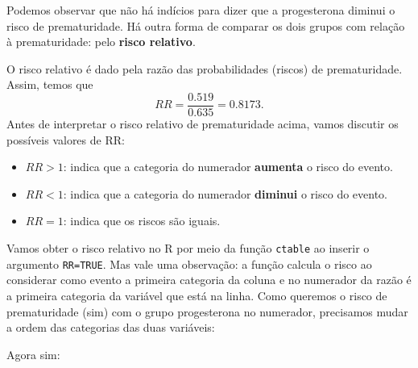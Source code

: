 \documentclass[
]{book}
\newenvironment{Shaded}{\begin{snugshade}}{\end{snugshade}}
\newcommand{\CommentTok}[1]{\textcolor[rgb]{0.56,0.35,0.01}{\textit{#1}}}
\newcommand{\DataTypeTok}[1]{\textcolor[rgb]{0.13,0.29,0.53}{#1}}
\newcommand{\KeywordTok}[1]{\textcolor[rgb]{0.13,0.29,0.53}{\textbf{#1}}}
\newcommand{\NormalTok}[1]{#1}
\newcommand{\OperatorTok}[1]{\textcolor[rgb]{0.81,0.36,0.00}{\textbf{#1}}}
\newcommand{\OtherTok}[1]{\textcolor[rgb]{0.56,0.35,0.01}{#1}}
\newcommand{\StringTok}[1]{\textcolor[rgb]{0.31,0.60,0.02}{#1}}
\begin{document}
Podemos observar que não há indícios para dizer que a progesterona diminui o risco de prematuridade. Há outra forma de comparar os dois grupos com relação à prematuridade: pelo \textbf{risco relativo}.

O risco relativo é dado pela razão das probabilidades (riscos) de prematuridade. Assim, temos que
\[
RR=\frac{0.519}{0.635}=0.8173. 
\]
Antes de interpretar o risco relativo de prematuridade acima, vamos discutir os possíveis valores de RR:

\begin{itemize}
\item
  \(RR>1\): indica que a categoria do numerador \textbf{aumenta} o risco do evento.
\item
  \(RR<1\): indica que a categoria do numerador \textbf{diminui} o risco do evento.
\item
  \(RR=1\): indica que os riscos são iguais.
\end{itemize}

Vamos obter o risco relativo no R por meio da função \texttt{ctable} ao inserir o argumento \texttt{RR=TRUE}. Mas vale uma observação: a função calcula o risco ao considerar como evento a primeira categoria da coluna e no numerador da razão é a primeira categoria da variável que está na linha. Como queremos o risco de prematuridade (sim) com o grupo progesterona no numerador, precisamos mudar a ordem das categorias das duas variáveis:

\begin{Shaded}
\end{Shaded}

Agora sim:

\begin{Shaded}
\end{Shaded}
\end{document}
